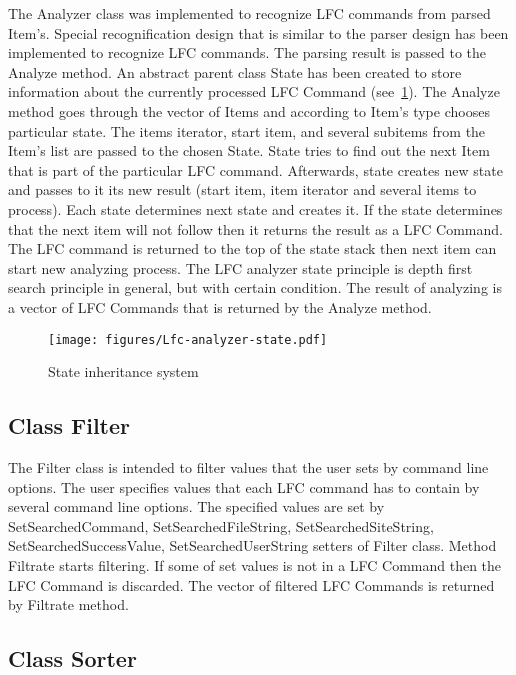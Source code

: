 \documentclass[a4paper, 11pt]{article} %
\begin{document}
The Analyzer class was implemented to recognize LFC commands from parsed Item's. Special recognification design that is similar to the parser design has been implemented to recognize LFC commands. The parsing result is passed to the Analyze method. An abstract parent class State has been created to store information about the currently processed LFC Command (see~\ref{fig:states}). The Analyze method goes through the vector of Items and according to Item's type chooses particular state. The items iterator, start item, and several subitems from the Item's list are passed to the chosen State. State tries to find out the next Item that is part of the particular LFC command. Afterwards, state creates new state and passes to it its new result (start item, item iterator and several items to process). Each state determines next state and creates it. If the state determines that the next item will not follow then it returns the result as a LFC Command. The LFC command is returned to the top of the state stack then next item can start new analyzing process. The LFC analyzer state principle is depth first search principle in general, but with certain condition. The result of analyzing is a vector of LFC Commands that is returned by the Analyze method.

\begin{figure}[H]
  \centering
    \texttt{[image: figures/Lfc-analyzer-state.pdf]}
    \caption{State inheritance system}
    \label{fig:states}
\end{figure}

\subsection{Class Filter}
\label{c:filter}

The Filter class is intended to filter values that the user sets by command line options. The user specifies values that each LFC command has to contain by several command line options. The specified values are set by SetSearchedCommand, SetSearchedFileString, SetSearchedSiteString, SetSearchedSuccessValue, SetSearchedUserString setters of Filter class. Method Filtrate starts filtering. If some of set values is not in a LFC Command then the LFC Command is discarded. The vector of filtered LFC Commands is returned by Filtrate method.

\subsection{Class Sorter}
\label{c:sorter}
\end{document}
